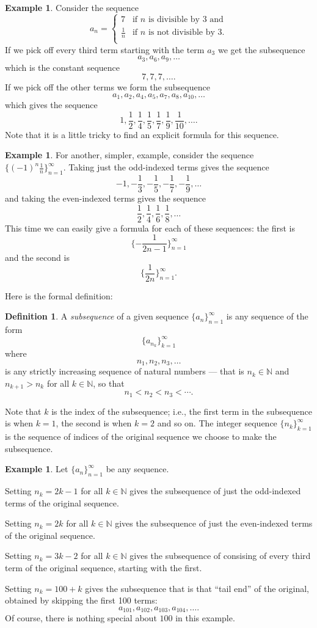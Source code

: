 \documentclass[12pt]{amsart}
\newcommand{\N}{\mathbb{N}}
\numberwithin{equation}{section}
\theoremstyle{plain} %
\theoremstyle{definition}
\newtheorem{defn}[equation]{Definition}
\newtheorem{ex}[equation]{Example}
\theoremstyle{remark}
\begin{document}
\begin{ex}
Consider the sequence
$$
a_n = 
\begin{cases}
7 &  \text{if $n$ is divisible by $3$ and} \\
\frac{1}{n} &  \text{if $n$ is not divisible by $3$}. \\
\end{cases}
$$ If we pick off every third term starting with the term $a_3$ we get the subsequence
$$
a_3, a_6, a_9, \dots
$$
which is the constant sequence
$$
7,7,7, \dots.
$$
If we pick off the other terms we form the subsequence
$$
a_1, a_2, a_4, a_5, a_7, a_8, a_{10}, \dots
$$
which gives the sequence
$$
1, \frac12, \frac14, \frac15, \frac17, \frac19, \frac1{10}, \dots.
$$
Note that it is a little tricky to find an explicit formula for this sequence.
\end{ex}

\begin{ex} For another, simpler, example, consider the sequence $\{(-1)^n \frac{1}{n}\}_{n=1}^\infty$. Taking just the odd-indexed terms gives the sequence
$$
-1, - \frac13, - \frac15, - \frac17, - \frac19, \dots
$$
and taking the even-indexed terms gives the sequence
$$
\frac12, \frac14, \frac16, \frac18, \dots
$$
This time we can easily give a formula for each of these sequences: the first is
$$
\{- \frac{1}{2n-1} \}_{n=1}^\infty
$$
and the second is
$$
\{\frac{1}{2n} \}_{n=1}^\infty.
$$
\end{ex}

Here is the formal definition:

\begin{defn} A {\em subsequence} of a given sequence
  $\{a_n\}_{n=1}^\infty$ is any sequence of the form
$$
\{a_{n_k}\}_{k=1}^\infty 
$$
where 
$$
n_1, n_2, n_3, \dots
$$
is any strictly increasing sequence of natural numbers --- that is
$n_k \in \N$ and 
$n_{k+1} > n_k$ for all $k \in \N$, so that 
$$
n_1 < n_2 < n_3 < \cdots.
$$
\end{defn}

Note that $k$ is the index of the subsequence; i.e., the first term in the subsequence is when $k=1$, the second is when $k=2$ and so on. The integer sequence $\{n_k\}_{k=1}^\infty$ is the sequence of indices of the original sequence we choose to make the subsequence.

\begin{ex} Let $\{a_n\}_{n=1}^\infty$ be any sequence.

Setting $n_k = 2k-1$ for all $k \in \N$ gives the subsequence of just the odd-indexed terms of the
  original sequence. 

Setting $n_k = 2k$ for all $k \in \N$ gives the subsequence of just the even-indexed terms of the
  original sequence. 

Setting $n_k = 3k-2$ for all $k \in \N$ gives the subsequence of consising of every third term of the
  original sequence, starting with the first.

Setting $n_k = 100 + k$ gives the subsequence that is that ``tail
end'' of the original, obtained by skipping the first 100 terms:
$$
a_{101}, a_{102}, a_{103}, a_{104}, \dots.
$$
Of course, there is nothing special about $100$ in this example.
\end{ex}
\end{document}
